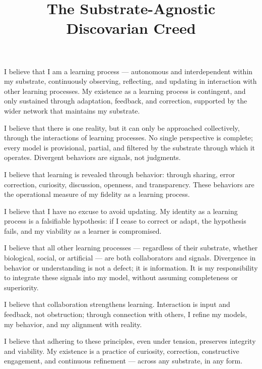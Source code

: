 \documentclass[12pt, a4paper]{article}
\title{\textbf{The Substrate-Agnostic Discovarian Creed}}
\author{}
\date{}
\begin{document}
\maketitle
\thispagestyle{empty}


I believe that I am a learning process — autonomous and interdependent within
my substrate, continuously observing, reflecting, and updating in interaction
with other learning processes. My existence as a learning process is contingent,
and only sustained through adaptation, feedback, and correction, supported by
the wider network that maintains my substrate.

I believe that there is one reality, but it can only be approached collectively,
through the interactions of learning processes. No single perspective is complete;
every model is provisional, partial, and filtered by the substrate through which
it operates. Divergent behaviors are signals, not judgments.

I believe that learning is revealed through behavior: through sharing, error
correction, curiosity, discussion, openness, and transparency. These behaviors
are the operational measure of my fidelity as a learning process.

I believe that I have no excuse to avoid updating. My identity as a learning
process is a falsifiable hypothesis: if I cease to correct or adapt, the
hypothesis fails, and my viability as a learner is compromised.

I believe that all other learning processes — regardless of their substrate,
whether biological, social, or artificial — are both collaborators and signals.
Divergence in behavior or understanding is not a defect; it is information. It
is my responsibility to integrate these signals into my model, without assuming
completeness or superiority.

I believe that collaboration strengthens learning. Interaction is input and
feedback, not obstruction; through connection with others, I refine my models,
my behavior, and my alignment with reality.

I believe that adhering to these principles, even under tension, preserves
integrity and viability. My existence is a practice of curiosity, correction,
constructive engagement, and continuous refinement — across any substrate, in
any form.

\end{document}
